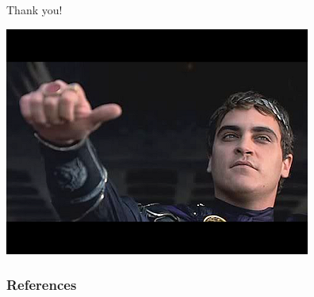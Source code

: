 \documentclass{beamer}
\begin{document}
{

\begin{frame}

	\begin{center}\huge{Thank you!}\end{center}
	\centering
	\vfill
	\includegraphics{commodus.png}
\end{frame}
}


\appendix
{

\begin{frame}[allowframebreaks] %
	\frametitle{References}

\end{frame}
}
\end{document}
